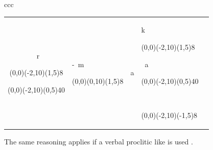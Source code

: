 \begin{tabular}{ccc}
\begin{tabular}{cllll}
~r\begin{picture}(0,0)\put(-2,10){\line(1,5){8}}\end{picture}
\E\begin{picture}(0,0)\put(-2,10){\line(0,5){40}}\end{picture}&
-~m\begin{picture}(0,0)\put(0,10){\line(1,5){8}}\end{picture} &
a   &
k\begin{picture}(0,0)\put(-2,10){\line(1,5){8}}\end{picture}
~a\begin{picture}(0,0)\put(-2,10){\line(0,5){40}}\end{picture}
~\ng\begin{picture}(0,0)\put(-2,10){\line(-1,5){8}}\end{picture}\\
	\end{tabular}
\end{tabular}
\z

The same reasoning applies if a verbal proclitic like  is used .

